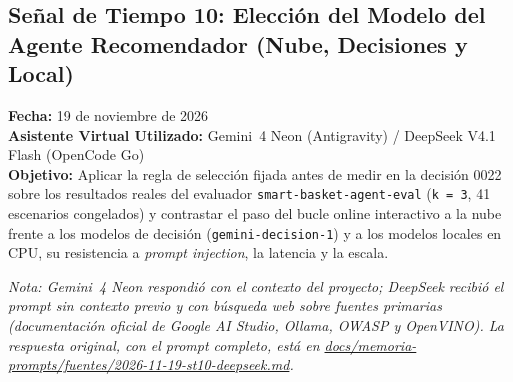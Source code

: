 \vspace{0.5cm}


\subsection{Señal de Tiempo 10: Elección del Modelo del Agente Recomendador (Nube, Decisiones y Local)}
\textbf{Fecha:} 19 de noviembre de 2026 \\
\textbf{Asistente Virtual Utilizado:} Gemini~4 Neon (Antigravity) / DeepSeek V4.1 Flash (OpenCode Go) \\
\textbf{Objetivo:} Aplicar la regla de selección fijada antes de medir en la decisión 0022 sobre los resultados reales del evaluador \texttt{smart-basket-agent-eval} (\texttt{k = 3}, 41 escenarios congelados) y contrastar el paso del bucle online interactivo a la nube frente a los modelos de decisión (\texttt{gemini-decision-1}) y a los modelos locales en CPU, su resistencia a \textit{prompt injection}, la latencia y la escala.

\textit{Nota: Gemini~4 Neon respondió con el contexto del proyecto; DeepSeek recibió el prompt sin contexto previo y con búsqueda web sobre fuentes primarias (documentación oficial de Google AI Studio, Ollama, OWASP y OpenVINO). La respuesta original, con el prompt completo, está en \url{docs/memoria-prompts/fuentes/2026-11-19-st10-deepseek.md}.}

